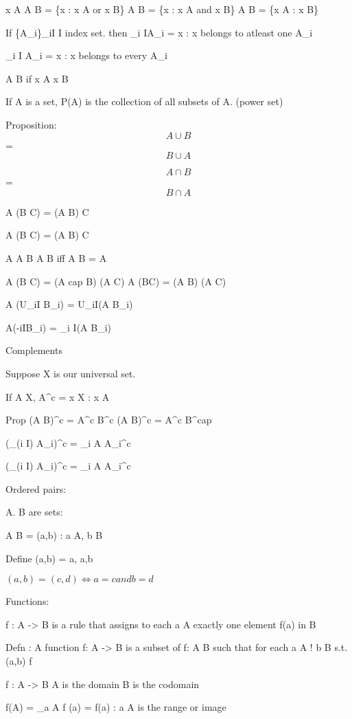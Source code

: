 x \in A 
A \cup B = \{x : x \in A or x \in B\}
A \cap B = \{x : x \in A and x \in B\}
A \sub B = \{x \in A : x \not\in B\}

If \{A_i\}_{i\in I} I index set. 
then \big\cup_{i \in I}A_i = {x : x belongs to atleast one A_i}

\big\cap_{i \in I} A_i = {x : x belongs to every A_i}

A \Subset B if x \in A \implies x \in B 

If A is a set, P(A) is the collection of all subsets of A. (power set)

Proposition: $$A \cup B$$ = $$B \cup A$$

$$A \cap B$$ = $$B \cap A$$

A \cup (B \cup C) = (A \cup B) \cup C

A \cap (B \cap C) = (A \cap B) \cap C

A \Subset A \cup B 
A \Subset B iff A \cap B = A

A \cap (B \cup C) = (A cap B) \cup (A \cap C)
A \cup (B\cap C) = (A \cup B) \cap (A \cup C)

A \cup (U_{i\in I} B_i) = U_{i\in I}(A \cap B_i)

A\cup (\cap-{i\in I}B_i) = \cap_{i \in I}(A \cup B_i)

Complements

Suppose X is our universal set.

If A \sub X, A^c = {x \in X : x \in A}

Prop (A \cup B)^c = A^c \cap B^c 
(A \cup  B)^c = A^c \cup B^cap

(\cup_(i \in I) A_i)^c = \cap_{i \in A} A_i^c 

(\cap_(i \in I) A_i)^c = \cup_{i \in A} A_i^c 

Ordered pairs:

A. B are sets:

A \times B = {(a,b) : a \in A, b \in B}

Define (a,b) = {{a}, {a,b}}

$(a,b) = (c,d) \iff a = c and b = d$

Functions:

f : A -> B is a rule that assigns to each a \in A exactly one element f(a) in B

Defn : A function f: A -> B is a subset of \tilde f: A \times B such that for each a \in A \exists ! b \in B s.t. (a,b) \in \tilde f

f : A -> B 
A is the domain
B is the codomain

f(A) = \cup _a \in A {f (a)} = {f(a) : a \in A} is the range or image

